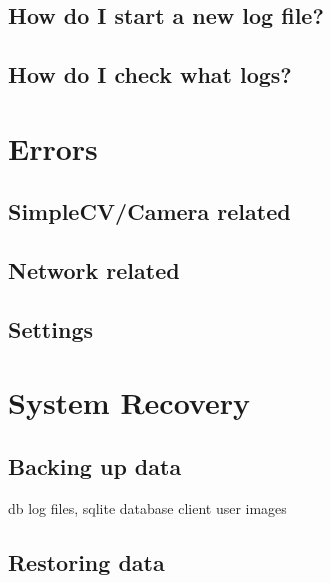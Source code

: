 \documentclass[a4paper]{article}
\begin{document}
    \subsection{How do I start a new log file?}
    \subsection{How do I check what logs?}
\section{Errors}
    \subsection{SimpleCV/Camera related}
    \subsection{Network related}
    \subsection{Settings}
\section{System Recovery}
    \subsection{Backing up data}
    db\newline
    log files, sqlite database
    client\newline
    user images
    \subsection{Restoring data}
\end{document}
